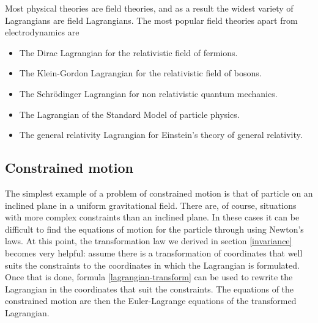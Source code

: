 \documentclass[prb,preprint]{revtex4-1}
\begin{document}
Most physical theories are field theories, and as a result the widest variety of Lagrangians are field Lagrangians. The most popular field theories apart from electrodynamics are
\begin{itemize}
  \item The Dirac Lagrangian for the relativistic field of fermions.
  \item The Klein-Gordon Lagrangian for the relativistic field of bosons.
  \item The Schr{\"o}dinger Lagrangian for non relativistic quantum mechanics.
  \item The Lagrangian of the Standard Model of particle physics.
  \item The general relativity Lagrangian for Einstein's theory of general relativity.
\end{itemize}


\subsection{Constrained motion \cite{Kuypers}}
The simplest example of a problem of constrained motion is that of particle on an inclined plane in a uniform gravitational field. There are, of course, situations with more complex constraints than an inclined plane. In these cases it can be difficult to find the equations of motion for the particle through using Newton's laws. At this point, the transformation law we derived in section \ref{invariance} becomes very helpful: assume there is a transformation of coordinates that well suits the constraints to the coordinates in which the Lagrangian is formulated. Once that is done, formula \eqref{lagrangian-transform} can be used to rewrite the Lagrangian in the coordinates that suit the constraints. The equations of the constrained motion are then the Euler-Lagrange equations of the transformed Lagrangian.







\end{document}
